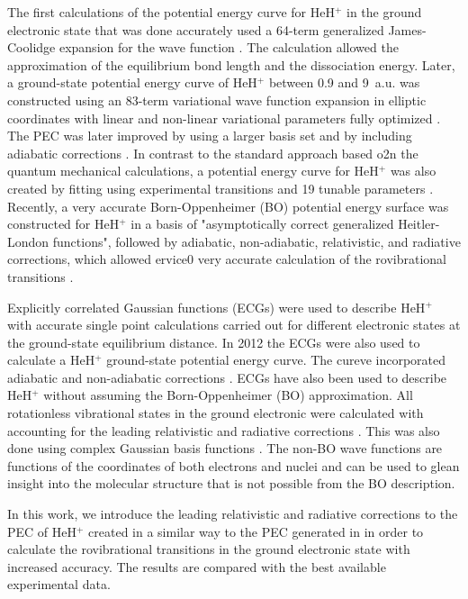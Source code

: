 \documentclass[aps,onecolumn]{revtex4}
\begin{document}
The first calculations of the potential energy curve for HeH$^+$ 
in the ground electronic state 
that was done accurately used a 64-term
generalized James-Coolidge expansion for the wave function \cite{PES7}. 
The calculation allowed the
approximation of the equilibrium bond length and the dissociation energy. 
Later, a ground-state potential
energy curve of HeH$^+$ between 0.9 and 9~a.u. was constructed using an 83-term variational
wave function expansion in elliptic coordinates with linear and non-linear variational
parameters fully optimized \cite{PES3, PES4}. The PEC was later improved by using a larger basis set and
by including adiabatic corrections \cite{PES8}. In contrast to the standard approach
based o2n the quantum mechanical calculations, a potential energy
curve for HeH$^+$ was also created by fitting using
experimental transitions and 19 tunable parameters \cite{PES2_exptrans_fit}. Recently,
a very accurate Born-Oppenheimer (BO) potential energy surface was constructed for HeH$^+$
in a basis of "asymptotically correct generalized Heitler-London functions"\cite{PES6},
followed by adiabatic, non-adiabatic, relativistic, and radiative corrections, which allowed
ervice0 very accurate calculation of the rovibrational transitions \cite{PES5}.

Explicitly correlated Gaussian functions (ECGs) were used to describe HeH$^+$ with accurate
single point calculations carried out for different electronic states \cite{ECG_HeH+} at
the ground-state equilibrium distance. In 2012 the ECGs were also used
to calculate a HeH$^+$ ground-state potential energy curve. The cureve incorporated
adiabatic and non-adiabatic corrections \cite{HeH+_Wei2012}.
ECGs have also been used to describe HeH$^+$ without assuming the Born-Oppenheimer (BO) approximation.
All rotationless vibrational states in the ground electronic were calculated \cite{Theory3}
with accounting for 
the leading relativistic and radiative corrections \cite{Theory4, Theory2}. 
This was also done using 
complex Gaussian basis functions \cite{Theory1}. The non-BO wave functions are 
functions of the coordinates 
of both electrons and nuclei and can be used to glean insight into the 
molecular structure that is
not possible from the BO description.

In this work, we introduce the leading
relativistic and radiative corrections to the PEC of HeH$^+$ created
in a similar way to the PEC generated in \cite{HeH+_Wei2012} 
in order to calculate the 
rovibrational transitions in the ground electronic state with
increased accuracy. The results are compared with 
the best available experimental data.
\end{document}
